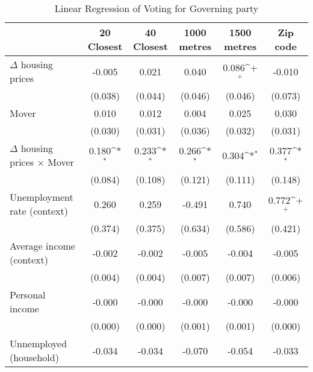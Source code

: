 \begin{table}[htbp]\centering
\def\sym#1{\ifmmode^{#1}\else\(^{#1}\)\fi}
\caption{Linear Regression of Voting for Governing party } \footnotesize \label{tabmovers}
\begin{tabular}{l*{5}{c}}
\hline\hline
                    &\multicolumn{1}{c}{20 Closest}&\multicolumn{1}{c}{40 Closest}&\multicolumn{1}{c}{1000 metres}&\multicolumn{1}{c}{1500 metres}&\multicolumn{1}{c}{Zip code}\\
\hline
$\Delta$ housing prices&      -0.005       &       0.021       &       0.040       &       0.086\sym{+}&      -0.010       \\
                    &     (0.038)       &     (0.044)       &     (0.046)       &     (0.046)       &     (0.073)       \\
[1em]
Mover               &       0.010       &       0.012       &       0.004       &       0.025       &       0.030       \\
                    &     (0.030)       &     (0.031)       &     (0.036)       &     (0.032)       &     (0.031)       \\
[1em]
$\Delta$ housing prices $\times$ Mover&       0.180\sym{*}&       0.233\sym{*}&       0.266\sym{*}&       0.304\sym{*}&       0.377\sym{*}\\
                    &     (0.084)       &     (0.108)       &     (0.121)       &     (0.111)       &     (0.148)       \\
[1em]
Unemployment rate (context)&       0.260       &       0.259       &      -0.491       &       0.740       &       0.772\sym{+}\\
                    &     (0.374)       &     (0.375)       &     (0.634)       &     (0.586)       &     (0.421)       \\
[1em]
Average income (context)&      -0.002       &      -0.002       &      -0.005       &      -0.004       &      -0.005       \\
                    &     (0.004)       &     (0.004)       &     (0.007)       &     (0.007)       &     (0.006)       \\
[1em]
Personal income     &      -0.000       &      -0.000       &      -0.000       &      -0.000       &      -0.000       \\
                    &     (0.000)       &     (0.000)       &     (0.001)       &     (0.001)       &     (0.000)       \\
[1em]
Unnemployed (household)&      -0.034       &      -0.034       &      -0.070       &      -0.054       &      -0.033       \\

\end{tabular}
\end{table}

